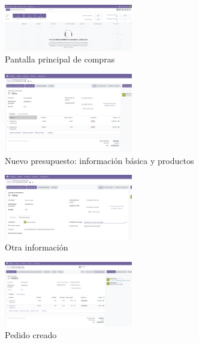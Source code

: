 \documentclass[a4paper,12pt]{article}
\begin{document}
\begin{figure}[h!]
    \centering
    \includegraphics[width=0.5\textwidth]{pr2odoo27-pantallaPrincipalCompras.png}
    \caption{Pantalla principal de compras}
\end{figure}
\FloatBarrier

\begin{figure}[h!]
    \centering
    \includegraphics[width=0.5\textwidth]{pr2odoo28-nuevoPresupuesto.png}
    \caption{Nuevo presupuesto: información básica y productos}
\end{figure}
\FloatBarrier

\begin{figure}[h!]
    \centering
    \includegraphics[width=0.5\textwidth]{pr2odoo29-otraInfo.png}
    \caption{Otra información}
\end{figure}
\FloatBarrier

\begin{figure}[h!]
    \centering
    \includegraphics[width=0.5\textwidth]{pr2odoo30-pedidoCreado.png}
    \caption{Pedido creado}
\end{figure}
\FloatBarrier
\end{document}
